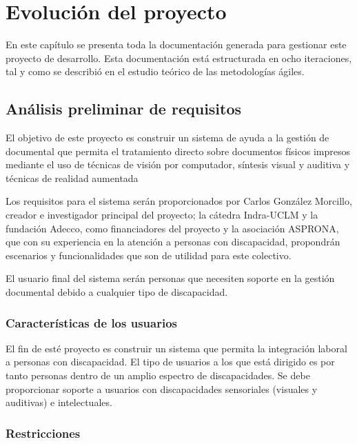 \section{Evolución del proyecto}
En este capítulo se presenta toda la documentación generada para gestionar este proyecto de desarrollo. Esta documentación está estructurada en ocho iteraciones, tal y como se describió en el estudio teórico de las metodologías ágiles. 


\subsection{Análisis preliminar de requisitos}
El objetivo de este proyecto es construir un sistema de ayuda a la gestión de documental que permita el tratamiento directo sobre documentos físicos impresos mediante el
uso de técnicas de visión por computador, síntesis visual y auditiva y técnicas de realidad aumentada

Los requisitos para el sistema serán proporcionados por Carlos González Morcillo, creador e investigador principal del proyecto; la cátedra Indra-UCLM y la fundación Adecco, como financiadores del proyecto y la asociación ASPRONA, que con su experiencia en la atención a personas con discapacidad, propondrán escenarios y funcionalidades que son de utilidad para este colectivo. 

El usuario final del sistema serán personas que necesiten soporte en la gestión documental debido a cualquier tipo de discapacidad.

\subsubsection{Características de los usuarios}
El fin de esté proyecto es construir un sistema que permita la integración laboral a personas con discapacidad. El tipo de usuarios a los que está dirigido es por tanto personas dentro de un amplio espectro de discapacidades.
Se debe proporcionar soporte a usuarios con discapacidades sensoriales (visuales y auditivas) e intelectuales.  

\subsubsection{Restricciones}

